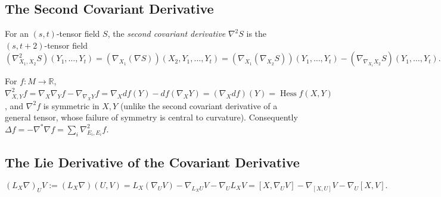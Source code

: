 \subsection{The Second Covariant Derivative}

\begin{definition}
  \label{def:pet-ch2-second-covariant-derivative}


  For an $(s,t)$-tensor field $S$, the \emph{second covariant derivative}
  $\nabla^2S$ is the $(s,t+2)$-tensor field
  \[
    (\nabla^2_{X_1,X_2}S)(Y_1,\dots,Y_t)
    = (\nabla_{X_1}(\nabla S))(X_2,Y_1,\dots,Y_t)
    = (\nabla_{X_1}(\nabla_{X_2}S))(Y_1,\dots,Y_t)-(\nabla_{\nabla_{X_1}X_2}S)(Y_1,\dots,Y_t).
  \]
\end{definition}

\begin{remark}
  \label{rem:pet-ch2-hessian-second-covariant-derivative}


  For $f:M\to\mathbb{R}$, $\nabla^2_{X,Y}f=\nabla_X\nabla_Yf-\nabla_{\nabla_XY}f
  =\nabla_Xdf(Y)-df(\nabla_XY)=(\nabla_Xdf)(Y)=\operatorname{Hess}f(X,Y)$, and
  $\nabla^2f$ is symmetric in $X,Y$ (unlike the second covariant derivative of
  a general tensor, whose failure of symmetry is central to curvature).
  Consequently $\Delta f=-\nabla^*\nabla f=\sum_i\nabla^2_{E_i,E_i}f$.
\end{remark}

\subsection{The Lie Derivative of the Covariant Derivative}

\begin{definition}
  \label{def:pet-ch2-lie-derivative-connection}


  \[
    (L_X\nabla)_UV := (L_X\nabla)(U,V)
    = L_X(\nabla_UV)-\nabla_{L_XU}V-\nabla_UL_XV
    = [X,\nabla_UV]-\nabla_{[X,U]}V-\nabla_U[X,V].
  \]
\end{definition}

